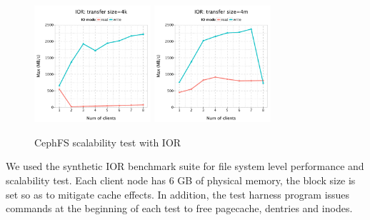 \begin{figure}[!t]

\centerline{\subfloat[4 KB transfer size]
{\includegraphics[width=1.7in]{data/ior_4k}
\label{fig:ior4k}}
\hfil
\subfloat[4 MB transfer size]
{\includegraphics[width=1.7in]{data/ior_4m}
\label{fig:ior4m}}
}%
\caption{CephFS scalability test with IOR}

\end{figure}


We used the synthetic IOR benchmark
suite\cite{ior} for file system
level performance and scalability test.  
Each client node has 6 GB of physical memory, the block
size is set so as to mitigate cache effects. In addition, the test harness
program issues commands at the beginning of each test to free pagecache,
dentries and inodes.


